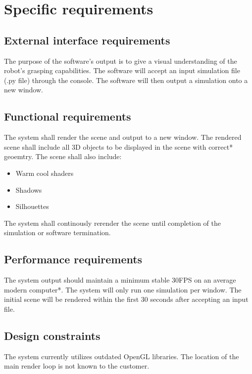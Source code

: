 \documentclass[10pt,journal,compsoc]{IEEEtran}
\begin{document}
\newpage

\section{Specific requirements}
\vspace{3mm}

\subsection{External interface requirements}
\vspace{3mm}
The purpose of the software's output is to give a visual understanding of the robot's grasping capabilities.
The software will accept an input simulation file (.py file) through the console.
The software will then output a simulation onto a new window.

\vfill

\subsection{Functional requirements}
\vspace{3mm}
The system shall render the scene and output to a new window.
The rendered scene shall include all 3D objects to be displayed in the scene with correct* geoemtry.
The scene shall also include:
\begin{itemize}
\item Warm cool shaders
\item Shadows
\item Silhouettes
\end{itemize}
The system shall continously rerender the scene until completion of the simulation or software termination.

\vfill

\subsection{Performance requirements}
\vspace{3mm}
The system output should maintain a minimum stable 30FPS on an average modern computer*.
The system will only run one simulation per window.
The initial scene will be rendered within the first 30 seconds after accepting an input file.

\vfill

\subsection{Design constraints}
\vspace{3mm}
The system currently utilizes outdated OpenGL libraries.
The location of the main render loop is not known to the customer.
\end{document}

